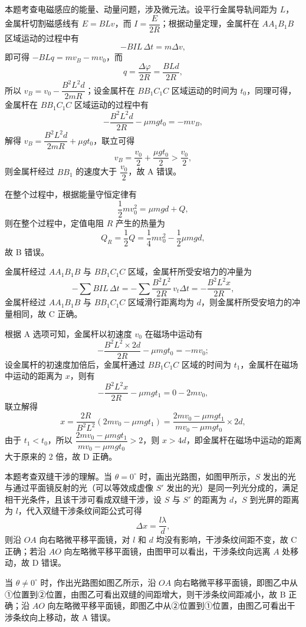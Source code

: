 \begin{answer}
本题考查电磁感应的能量、动量问题，涉及微元法。设平行金属导轨间距为 $L$，金属杆切割磁感线有 $E=BLv$，而 $I=\dfrac{E}{2R}$；根据动量定理，金属杆在 $AA_{1}B_{1}B$ 区域运动的过程中有
\[
  -BIL\,\Delta t=m\Delta v,
\]
即可得 $-BLq=mv_{B}-mv_{0}$，而
\[
  q=\frac{\Delta\varphi}{2R}=\frac{BLd}{2R},
\]
所以 $v_{B}=v_{0}-\dfrac{B^{2}L^{2}d}{2mR}$；设金属杆在 $BB_{1}C_{1}C$ 区域运动的时间为 $t_{0}$，同理可得，金属杆在 $BB_{1}C_{1}C$ 区域运动的过程中有
\[
  -\frac{B^{2}L^{2}d}{2R}-\mu mgt_{0}=-mv_{B},
\]
解得 $v_{B}=\dfrac{B^{2}L^{2}d}{2mR}+\mu gt_{0}$，联立可得
\[
  v_{B}=\frac{v_{0}}{2}+\frac{\mu gt_{0}}{2}>\frac{v_{0}}{2},
\]
则金属杆经过 $BB_{1}$ 的速度大于 $\dfrac{v_{0}}{2}$，故 A 错误。

在整个过程中，根据能量守恒定律有
\[
  \frac{1}{2}mv_{0}^{2}=\mu mgd+Q,
\]
则在整个过程中，定值电阻 $R$ 产生的热量为
\[
  Q_{R}=\frac{1}{2}Q=\frac{1}{4}mv_{0}^{2}-\frac{1}{2}\mu mgd,
\]
故 B 错误。

金属杆经过 $AA_{1}B_{1}B$ 与 $BB_{1}C_{1}C$ 区域，金属杆所受安培力的冲量为
\[
  -\sum BIL\,\Delta t=-\sum\frac{B^{2}L^{2}}{2R}\,v_{t}\Delta t=-\frac{B^{2}L^{2}x}{2R},
\]
金属杆经过 $AA_{1}B_{1}B$ 与 $BB_{1}C_{1}C$ 区域滑行距离均为 $d$，则金属杆所受安培力的冲量相同，故 C 正确。

根据 A 选项可知，金属杆以初速度 $v_{0}$ 在磁场中运动有
\[
  -\frac{B^{2}L^{2}\times 2d}{2R}-\mu mgt_{0}=-mv_{0};
\]
设金属杆的初速度加倍后，金属杆通过 $BB_{1}C_{1}C$ 区域的时间为 $t_{1}$，金属杆在磁场中运动的距离为 $x$，则有
\[
  -\frac{B^{2}L^{2}x}{2R}-\mu mgt_{1}=0-2mv_{0},
\]
联立解得
\[
  x=\frac{2R}{B^{2}L^{2}}(2mv_{0}-\mu mgt_{1})
    =\frac{2mv_{0}-\mu mgt_{1}}{mv_{0}-\mu mgt_{0}}\times 2d,
\]
由于 $t_{1}<t_{0}$，所以 $\dfrac{2mv_{0}-\mu mgt_{1}}{mv_{0}-\mu mgt_{0}}>2$，则 $x>4d$，即金属杆在磁场中运动的距离大于原来的 2 倍，故 D 正确。
\end{answer}

\begin{answer}
本题考查双缝干涉的理解。当 $\theta=0^{\circ}$ 时，画出光路图，如图甲所示，$S$ 发出的光与通过平面镜反射的光（可以等效成虚像 $S'$ 发出的光）是同一列光分成的，满足相干光条件，且该干涉可看成双缝干涉，设 $S$ 与 $S'$ 的距离为 $d$，$S$ 到光屏的距离为 $l$，代入双缝干涉条纹间距公式可得
\[
  \Delta x=\frac{l\lambda}{d},
\]
则沿 $OA$ 向右略微平移平面镜，对 $l$ 和 $d$ 均没有影响，干涉条纹间距不变，故 C 正确；若沿 $AO$ 向左略微平移平面镜，由图甲可以看出，干涉条纹向远离 $A$ 处移动，故 D 错误。


当 $\theta\ne 0^{\circ}$ 时，作出光路图如图乙所示，沿 $OA$ 向右略微平移平面镜，即图乙中从①位置到②位置，由图乙可看出双缝的间距增大，则干涉条纹间距减小，故 B 正确；沿 $AO$ 向左略微平移平面镜，即图乙中从②位置到①位置，由图乙可看出干涉条纹向上移动，故 A 错误。

\end{answer}

